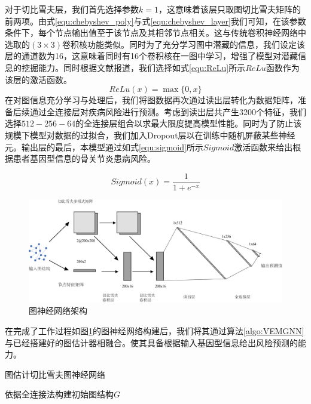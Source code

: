 对于切比雪夫层，我们首先选择参数$k=1$，这意味着该层只取图切比雪夫矩阵的前两项。由式\ref{equ:chebyshev_poly}与式\ref{equ:chebyshev_layer}我们可知，在该参数条件下，每个节点输出值至于该节点及其相邻节点相关。这与传统卷积神经网络中选取的$(3\times 3)$卷积核功能类似。同时为了充分学习图中潜藏的信息，我们设定该层的通道数为16，这意味着同时有16个卷积核在一图中学习，增强了模型对潜藏信息的挖掘能力。同时根据文献报道，我们选择如式\ref{equ:ReLu}所示$ReLu$函数作为该层的激活函数。\cite{defferrard_convolutional_2017}
\begin{equation}\label{equ:ReLu}
    ReLu(x)=\max \{0,x\}
\end{equation}
在对图信息充分学习与处理后，我们将图数据再次通过读出层转化为数据矩阵，准备后续通过全连接层对疾病风险进行预测。考虑到读出层共产生3200个特征，我们选择$512-256-64$的全连接层组合以求最大限度提高模型性能。同时为了防止该规模下模型对数据的过拟合，我们加入Dropout层以在训练中随机屏蔽某些神经元。输出层的最后，本模型通过如式\ref{equ:sigmoid}所示$Sigmoid$激活函数来给出根据患者基因型信息的骨关节炎患病风险。

\begin{equation}\label{equ:sigmoid}
    Sigmoid(x)=\frac{1}{1+e^{-x}}
\end{equation}

\begin{figure}[!ht]
  \centering
  \includegraphics[width=\textwidth]{./figures/Chapter3/GNN.png}
  \caption{图神经网络架构} \label{fig:GNN}
\end{figure}

在完成了工作过程如图\ref{fig:GNN}的图神经网络构建后，我们将其通过算法\ref{algo:VEMGNN}与已经搭建好的图估计器相融合。使其具备根据输入基因型信息给出风险预测的能力。

\begin{algorithm}
\label{algo:VEMGNN}
\SetAlgoLined
\caption{图估计切比雪夫图神经网络}

依据全连接法构建初始图结构$G$

\end{algorithm}



